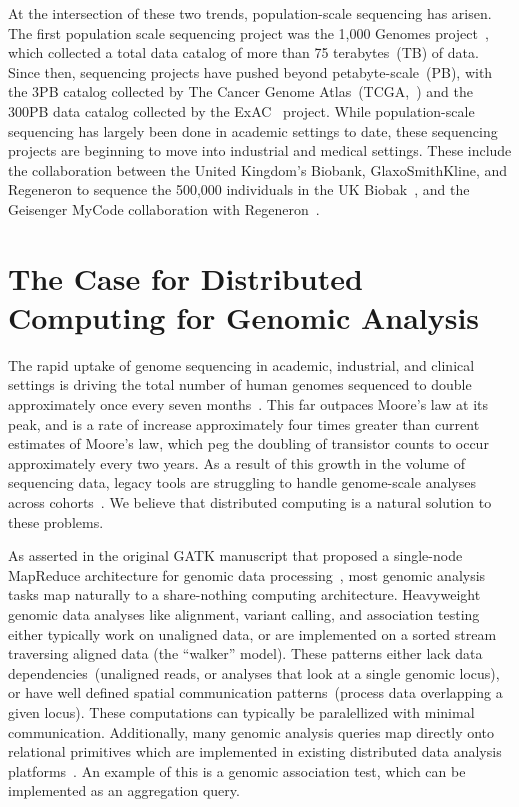 \documentclass[phd]{ucbthesis}
\begin{document}
At the intersection of these two trends, population-scale sequencing has arisen.
The first population scale sequencing project was the 1,000 Genomes
project~\cite{1kg}, which collected a total data catalog of more than 75
terabytes~(TB) of data. Since then, sequencing projects have pushed beyond
petabyte-scale~(PB), with the 3PB catalog collected by The Cancer Genome
Atlas~(TCGA,~\cite{weinstein13}) and the 300PB data catalog collected by the
ExAC~\cite{lek16} project. While population-scale sequencing has largely been
done in academic settings to date, these sequencing projects are beginning
to move into industrial and medical settings. These include the collaboration
between the United Kingdom's Biobank, GlaxoSmithKline, and Regeneron to sequence
the 500,000 individuals in the UK Biobak~\cite{ukbiobank}, and the Geisenger
MyCode collaboration with Regeneron~\cite{carey16}.

\section{The Case for Distributed Computing for Genomic Analysis}
\label{sec:distributed-computing-for-genomics}

The rapid uptake of genome sequencing in academic, industrial, and clinical
settings is driving the total number of human genomes sequenced to double
approximately once every seven months~\cite{stephens15}. This far outpaces
Moore's law at its peak, and is a rate of increase approximately four times
greater than current estimates of Moore's law, which peg the doubling of
transistor counts to occur approximately every two years. As a result of
this growth in the volume of sequencing data, legacy tools are struggling to
handle genome-scale analyses across cohorts~\cite{schadt10, linderman17}.
We believe that distributed computing is a natural solution to these problems.

As asserted in the original GATK manuscript that proposed a single-node
MapReduce architecture for genomic data processing~\cite{mckenna10}, most
genomic analysis tasks map naturally to a share-nothing computing architecture.
Heavyweight genomic data analyses like alignment, variant calling, and
association testing either typically work on unaligned data, or are implemented
on a sorted stream traversing aligned data (the ``walker'' model). These
patterns either lack data dependencies~(unaligned reads, or analyses that look
at a single genomic locus), or have well defined spatial communication
patterns~(process data overlapping a given locus). These computations can
typically be paralellized with minimal communication. Additionally, many genomic
analysis queries map directly onto relational primitives which are implemented
in existing distributed data analysis platforms~\cite{armbrust15}. An example of
this is a genomic association test, which can be implemented as an aggregation
query.
\end{document}
